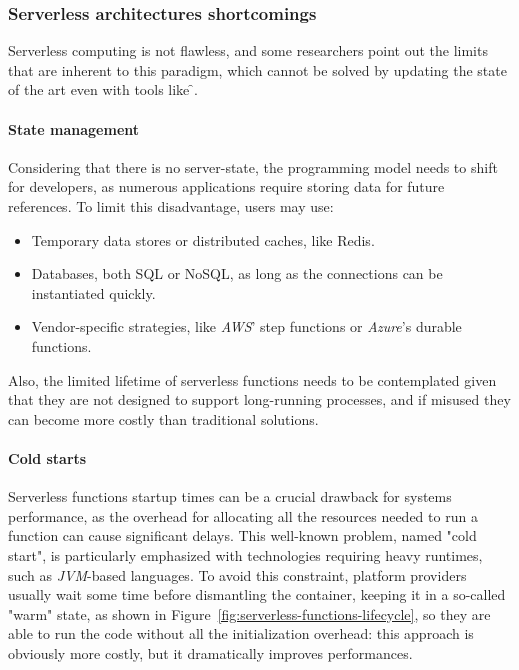 \subsubsection{Serverless architectures shortcomings}

Serverless computing is not flawless, and some researchers \cite{two-steps-back}
point out the limits that are inherent to this paradigm, which cannot be solved
by updating the state of the art even with tools like \f{}.

\paragraph{\textbf{State management}} Considering that there is no server-state,
the programming model needs to shift for developers, as numerous applications require
storing data for future references.
To limit this disadvantage, users may use:
\begin{itemize}
  \item Temporary data stores or distributed caches, like Redis.
  \item Databases, both SQL or NoSQL, as long as the connections can be instantiated quickly.
  \item Vendor-specific strategies, like \textit{AWS}' step functions or \textit{Azure}'s durable functions.
\end{itemize}
Also, the limited lifetime of serverless functions needs to be contemplated given that
they are not designed to support long-running processes,
and if misused they can become more costly than traditional solutions.

\paragraph{\textbf{Cold starts}} Serverless functions startup times
can be a crucial drawback for systems performance, as the overhead for
allocating all the resources needed to run a function can cause significant
delays. This well-known problem, named "cold start", is
particularly emphasized with technologies requiring heavy runtimes, such as \textit{JVM}-based languages.
To avoid this constraint, platform providers usually wait some time
before dismantling the container, keeping it in a so-called "warm" state, as shown in Figure~\ref{fig:serverless-functions-lifecycle},
so they are able to run the code without all the initialization overhead:
this approach is obviously more costly, but it dramatically improves performances.

